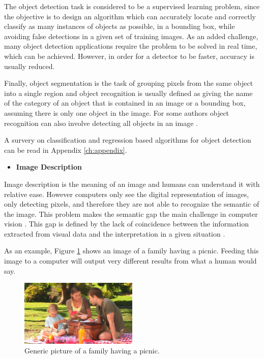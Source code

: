     \par The object detection task is considered to be a supervised learning problem, since the objective is to design an algorithm which can accurately locate and correctly classify as many instances of objects as possible, in a bounding box, while avoiding false detections in a given set of training images.  As an added challenge, many object detection applications require the problem to be solved in real time, which can be achieved. However, in order for a detector to be faster, accuracy is usually reduced. 

    \par Finally, object segmentation is the task of grouping pixels from the same object into a single region and object recognition is usually defined as giving the name of the category of an object that is contained in an image or a bounding box, assuming there is only one object in the image. For some authors object recognition can also involve detecting all objects in an image \cite{Agarwal2019}.

    A survery on classification and regression based algorithms for object detection can be read in Appendix \ref{ch:appendix}.

 

    \begin{itemize}
        \item \textbf{Image Description}
    \end{itemize}


    \par Image description is the meaning of an image and humans can understand it with relative ease. However computers only see the digital representation of images, only detecting pixels, and therefore they are not able to recognize the semantic of the image. This problem makes the semantic gap the main challenge in computer vision \cite{Huang2012}. This gap is defined by the lack of coincidence between the information extracted from visual data and the interpretation in a given situation \cite{Agarwal2019}.
    


    \par As an example, Figure \ref{fig:picnic} shows an image of a family having a picnic. Feeding this image to a computer will output very different results from what a human would say.

    \begin{figure}[H]
        \centering
        \captionsetup{justification=centering}
        \includegraphics[width=0.5\textwidth]{Sections/2StateOfTheArt/2_images/picinic.png}
        \caption{Generic picture of a family having a picnic.}
        \label{fig:picnic}  
    \end{figure}

